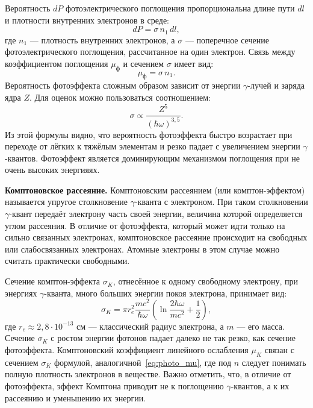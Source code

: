 \documentclass[12pt,a4paper]{article}
\begin{document}
Вероятность $dP$ фотоэлектрического поглощения пропорциональна длине пути $dl$ и плотности внутренних электронов в среде:
\begin{equation}
    dP = \sigma \, n_1 \, dl,
    \label{eq:photo_prob}
\end{equation}
где $n_1$ --- плотность внутренних электронов, а $\sigma$ --- поперечное сечение фотоэлектрического поглощения, рассчитанное на один электрон. Связь между коэффициентом поглощения $\mu_\text{ф}$ и сечением $\sigma$ имеет вид:
\begin{equation}
    \mu_\text{ф} = \sigma \, n_1.
    \label{eq:photo_mu}
\end{equation}
Вероятность фотоэффекта сложным образом зависит от энергии $\gamma$-лучей и заряда ядра $Z$. Для оценок можно пользоваться соотношением:
\begin{equation}
    \sigma \propto \frac{Z^5}{(\hbar\omega)^{3{,}5}}.
    \label{eq:photo_sigma}
\end{equation}
Из этой формулы видно, что вероятность фотоэффекта быстро возрастает при переходе от лёгких к тяжёлым элементам и резко падает с увеличением энергии $\gamma$-квантов. Фотоэффект является доминирующим механизмом поглощения при не очень высоких энергияях.

\textbf{Комптоновское рассеяние.} Комптоновским рассеянием (или комптон-эффектом) называется упругое столкновение $\gamma$-кванта с электроном. При таком столкновении $\gamma$-квант передаёт электрону часть своей энергии, величина которой определяется углом рассеяния. В отличие от фотоэффекта, который может идти только на сильно связанных электронах, комптоновское рассеяние происходит на свободных или слабосвязанных электронах. Атомные электроны в этом случае можно считать практически свободными.

Сечение комптон-эффекта $\sigma_K$, отнесённое к одному свободному электрону, при энергиях $\gamma$-кванта, много больших энергии покоя электрона, принимает вид:
\begin{equation}
    \sigma_K = \pi r_e^2 \frac{m c^2}{\hbar\omega} \left( \ln \frac{2\hbar\omega}{m c^2} + \frac{1}{2} \right),
    \label{eq:compton_sigma}
\end{equation}
где $r_e \approx 2{,}8 \cdot 10^{-13}$ см --- классический радиус электрона, а $m$ --- его масса. Сечение $\sigma_K$ с ростом энергии фотонов падает далеко не так резко, как сечение фотоэффекта. Комптоновский коэффициент линейного ослабления $\mu_K$ связан с сечением $\sigma_K$ формулой, аналогичной~\eqref{eq:photo_mu}, где под $n$ следует понимать полную плотность электронов в веществе. Важно отметить, что, в отличие от фотоэффекта, эффект Комптона приводит не к поглощению $\gamma$-квантов, а к их рассеянию и уменьшению их энергии.
\end{document}

